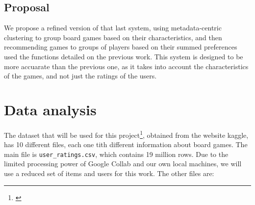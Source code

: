 \documentclass{article}
\begin{document}
\subsection{Proposal}

We propose a refined version of that last system, using metadata-centric clustering to group board games based on their characteristics, and then recommending games to groups of players based on their summed preferences used the functions detailed on the previous work. This system is designed to be more accuarate than the previous one, as it takes into account the characteristics of the games, and not just the ratings of the users.

\section{Data analysis}

The dataset that will be used for this project\footnote{\cite{board_games_kaggle}}, obtained from the website kaggle, has 10 different files, each one tith different information about board games. The main file is \texttt{user\_ratings.csv}, which contains 19 million rows. Due to the limited processing power of Google Collab and our own local machines, we will use a reduced set of items and users for this work. The other files are:
\end{document}
